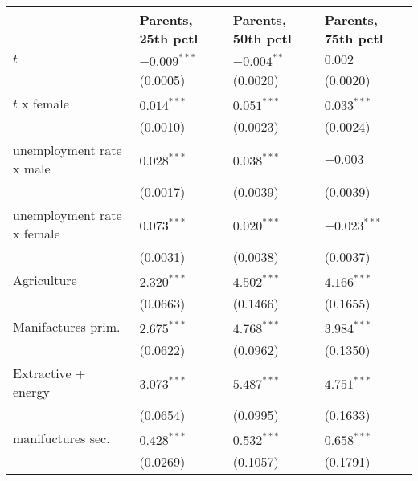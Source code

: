 \begin{tabular}{llll}
\toprule
{} & Parents, 25th pctl & Parents, 50th pctl & Parents, 75th pctl \\
\midrule
$t$                                                &     $-0.009^{***}$ &      $-0.004^{**}$ &            $0.002$ \\
                                                   &           (0.0005) &           (0.0020) &           (0.0020) \\
$t$ x female                                       &      $0.014^{***}$ &      $0.051^{***}$ &      $0.033^{***}$ \\
                                                   &           (0.0010) &           (0.0023) &           (0.0024) \\
unemployment rate x male                           &      $0.028^{***}$ &      $0.038^{***}$ &           $-0.003$ \\
                                                   &           (0.0017) &           (0.0039) &           (0.0039) \\
unemployment rate x female                         &      $0.073^{***}$ &      $0.020^{***}$ &     $-0.023^{***}$ \\
                                                   &           (0.0031) &           (0.0038) &           (0.0037) \\
Agriculture                                        &      $2.320^{***}$ &      $4.502^{***}$ &      $4.166^{***}$ \\
                                                   &           (0.0663) &           (0.1466) &           (0.1655) \\
Manifactures prim.                                 &      $2.675^{***}$ &      $4.768^{***}$ &      $3.984^{***}$ \\
                                                   &           (0.0622) &           (0.0962) &           (0.1350) \\
Extractive + energy                                &      $3.073^{***}$ &      $5.487^{***}$ &      $4.751^{***}$ \\
                                                   &           (0.0654) &           (0.0995) &           (0.1633) \\
manifuctures sec.                                  &      $0.428^{***}$ &      $0.532^{***}$ &      $0.658^{***}$ \\
                                                   &           (0.0269) &           (0.1057) &           (0.1791) \\

\end{tabular}
